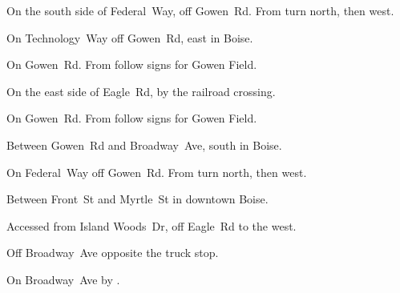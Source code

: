 
\begin{LocationList}

On the south side of Federal~Way, off  Gowen~Rd.
From   turn north, then west.

On Technology~Way off  Gowen~Rd, east in Boise.

On Gowen~Rd.
From   follow signs for Gowen Field.

On the east side of  Eagle~Rd, by the railroad crossing.

\Location{\GarageHQ \Garage}
On Gowen~Rd. From   follow signs for Gowen Field.

Between Gowen~Rd and Broadway~Ave, south in Boise.

On Federal~Way off  Gowen~Rd.
From   turn north, then west.

Between  Front~St and  Myrtle~St in downtown Boise.

Accessed from Island Woods~Dr, off  Eagle~Rd to the west.

\Location{\RecruitmentAgency \Recruitment}
Off Broadway~Ave opposite the truck stop.

\Location{\TruckStop \Gas \Rest \Service \Weigh}
On Broadway~Ave by  .

\end{LocationList}
